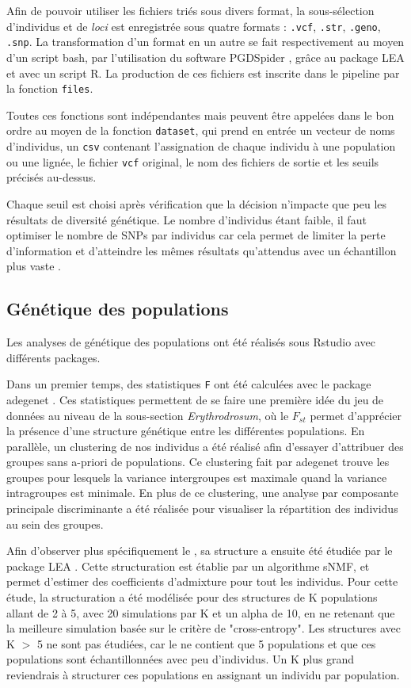 Afin de pouvoir utiliser les fichiers triés sous divers format, la sous-sélection d'individus et de \textit{loci} est enregistrée sous quatre formats : \verb|.vcf|, \verb|.str|, \verb|.geno|, \verb|.snp|.
 La transformation d'un format en un autre se fait respectivement au moyen d'un script bash, par l'utilisation du software PGDSpider \citep{Lischer2012}, grâce au package LEA \citep{Frichot2015} et avec un script R.
 La production de ces fichiers est inscrite dans le pipeline par la fonction \verb|files|.

Toutes ces fonctions sont indépendantes mais peuvent être appelées dans le bon ordre au moyen de la fonction \verb|dataset|, qui prend en entrée un vecteur de noms d'individus, un \verb|csv| contenant l'assignation de chaque individu à une population ou une lignée, le fichier \verb|vcf| original, le nom des fichiers de sortie et les seuils précisés au-dessus.

Chaque seuil est choisi après vérification que la décision n'impacte que peu les résultats de diversité génétique.
 Le nombre d'individus étant faible, il faut optimiser le nombre de SNPs par individus car cela permet de limiter la perte d'information et d'atteindre les mêmes résultats qu'attendus avec un échantillon plus vaste \citep{Nazareno2017}.


\subsection{Génétique des populations}

Les analyses de génétique des populations ont été réalisés sous Rstudio \citep{RTeam2017} avec différents packages. 

Dans un premier temps, des statistiques \verb|F| ont été calculées avec le package adegenet \citep{Jombart2011}. Ces statistiques permettent de se faire une première idée du jeu de données au niveau de la sous-section \textit{Erythrodrosum}, où le $F_{st}$ permet d'apprécier la présence d'une structure génétique entre les différentes populations.
 En parallèle, un clustering de nos individus a été réalisé afin d'essayer d'attribuer des groupes sans a-priori de populations. Ce clustering fait par adegenet trouve les groupes pour lesquels la variance intergroupes est maximale quand la variance intragroupes est minimale. En plus de ce clustering, une analyse par composante principale discriminante a été réalisée pour visualiser la répartition des individus au sein des groupes.
 
Afin d'observer plus spécifiquement le , sa structure a ensuite été étudiée par le package LEA \citep{Frichot2015}. Cette structuration est établie par un algorithme sNMF, et permet d'estimer des coefficients d'admixture pour tout les individus. Pour cette étude, la structuration a été modélisée pour des structures de K populations allant de 2 à 5, avec 20 simulations par K et un alpha de 10, en ne retenant que la meilleure simulation basée sur le critère de "cross-entropy". Les structures avec K $>$ 5 ne sont pas étudiées, car le  ne contient que 5 populations et que ces populations sont échantillonnées avec peu d'individus. Un K plus grand reviendrais à structurer ces populations en assignant un individu par population.
 
